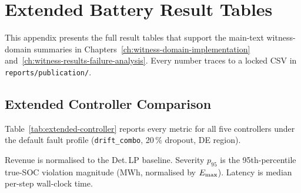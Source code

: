 \chapter{Extended Battery Result Tables}
\label{app:extended-results}

This appendix presents the full result tables that support the main-text
witness-domain summaries in Chapters~\ref{ch:witness-domain-implementation}
and~\ref{ch:witness-results-failure-analysis}.
Every number traces to a locked CSV in \texttt{reports/publication/}.

\section{Extended Controller Comparison}

Table~\ref{tab:extended-controller} reports every metric for all five
controllers under the default fault profile (\texttt{drift\_combo},
20\,\% dropout, DE region).

\begin{table}[htbp]
\centering
\caption{Extended controller comparison (DE, drift\_combo, 20\,\% dropout).
  Source: \texttt{dc3s\_main\_table.csv}.}
\label{tab:extended-controller}
\small
{}
\medskip

\footnotesize
Revenue is normalised to the Det.\,LP baseline.  Severity $p_{95}$ is the
95th-percentile true-SOC violation magnitude (MWh, normalised by $E_{\max}$).
Latency is median per-step wall-clock time.
\end{table}

